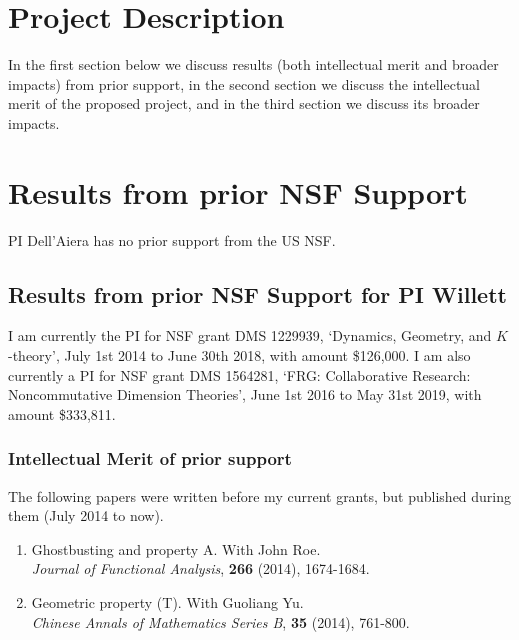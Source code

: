 \documentclass[11pt]{article}
\theoremstyle{plain}
\theoremstyle{definition}
\theoremstyle{remark}
\begin{document}
\section*{Project Description}



In the first section below we discuss results (both intellectual merit and broader impacts) from prior support, in the second section we discuss the intellectual merit of the proposed project, and in the third section we discuss its broader impacts.


 
 
\section{Results from prior NSF Support}

PI Dell'Aiera has no prior support from the US NSF.  

\subsection{Results from prior NSF Support for PI Willett}

I am currently the PI for NSF grant DMS 1229939, `Dynamics, Geometry, and $K$-theory', July 1st 2014 to June 30th 2018, with amount \$126,000.  I am also currently a PI for NSF grant DMS 1564281, `FRG: Collaborative Research: Noncommutative Dimension Theories', June 1st 2016 to May 31st 2019, with amount \$333,811.  

\subsubsection*{Intellectual Merit of prior support}

The following papers were written before my current grants, but published during them (July 2014 to now).

\begin{enumerate}
\item Ghostbusting and property A.  With John Roe.\\
{\small \emph{Journal of Functional Analysis}, \textbf{266} (2014), 1674-1684.}
\item Geometric property (T).  With Guoliang Yu.\\
{\small \emph{Chinese Annals of Mathematics Series B}, \textbf{35} (2014), 761-800.}
\end{enumerate}
\end{document}
